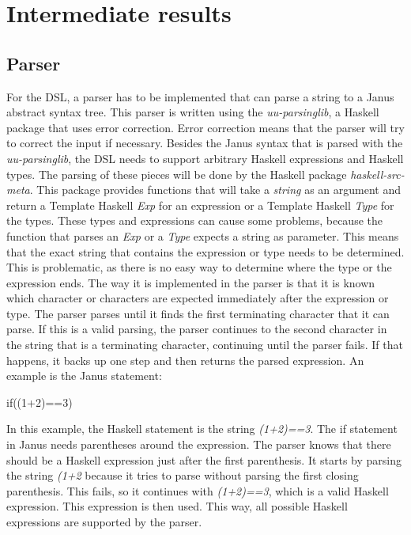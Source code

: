 \documentclass[12pt,a4paper]{article}
\begin{document}
\newpage

\section{Intermediate results}

\subsection{Parser}
For the DSL, a parser has to be implemented that can parse a string to a Janus abstract syntax tree. This parser is written using the \textit{uu-parsinglib}, a Haskell package that uses error correction. Error correction means that the parser will try to correct the input if necessary. Besides the Janus syntax that is parsed with the \textit{uu-parsinglib}, the DSL needs to support arbitrary Haskell expressions and Haskell types. The parsing of these pieces will be done by the Haskell package \textit{haskell-src-meta}. This package provides functions that will take a \textit{string} as an argument and return a Template Haskell \textit{Exp} for an expression or a Template Haskell \textit{Type} for the types. These types and expressions can cause some problems, because the function that parses an \textit{Exp} or a \textit{Type} expects a string as parameter. This means that the exact string that contains the expression or type needs to be determined. This is problematic, as there is no easy way to determine where the type or the expression ends. The way it is implemented in the parser is that it is known which character or characters are expected immediately after the expression or type. The parser parses until it finds the first terminating character that it can parse. If this is a valid parsing, the parser continues to the second character in the string that is a terminating character, continuing until the parser fails. If that happens, it backs up one step and then returns the parsed expression. An example is the Janus statement:
	\begin{displayquote}
		if((1+2)==3)
	\end{displayquote}
In this example, the Haskell statement is the string \textit{(1+2)==3}. The if statement in Janus needs parentheses around the expression. The parser knows that there should be a Haskell expression just after the first parenthesis. It starts by parsing the string \textit{(1+2} because it tries to parse without parsing the first closing parenthesis. This fails, so it continues with \textit{(1+2)==3}, which is a valid Haskell expression. This expression is then used. This way, all possible Haskell expressions are supported by the parser.
\end{document}
